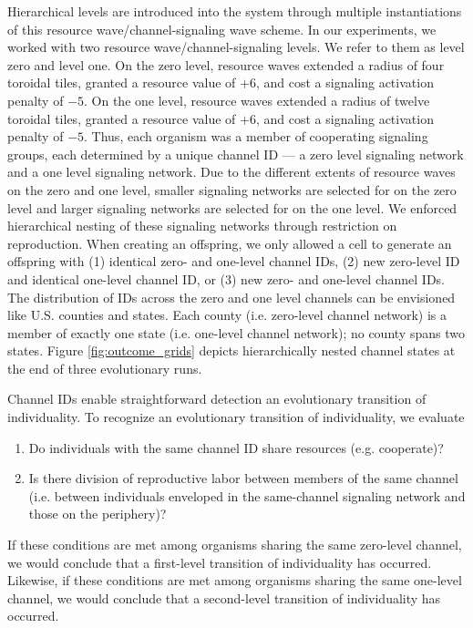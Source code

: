 Hierarchical levels are introduced into the system through multiple instantiations of this resource wave/channel-signaling wave scheme.
In our experiments, we worked with two resource wave/channel-signaling levels.
We refer to them as level zero and level one.
On the zero level, resource waves extended a radius of four toroidal tiles, granted a resource value of $+6$, and cost a signaling activation penalty of $-5$.
On the one level, resource waves extended a radius of twelve toroidal tiles, granted a resource value of $+6$, and cost a signaling activation penalty of $-5$.
Thus, each organism was a member of cooperating signaling groups, each determined by a unique channel ID --- a zero level signaling network and a one level signaling network.
Due to the different extents of resource waves on the zero and one level, smaller signaling networks are selected for on the zero level and larger signaling networks are selected for on the one level.
We enforced hierarchical nesting of these signaling networks through restriction on reproduction.
When creating an offspring, we only allowed a cell to generate an offspring with (1) identical zero- and one-level channel IDs, (2) new zero-level ID and identical one-level channel ID, or (3) new zero- and one-level channel IDs.
The distribution of IDs across the zero and one level channels can be envisioned like U.S. counties and states.
Each county (i.e. zero-level channel network) is a member of exactly one state (i.e. one-level channel network);
no county spans two states.
Figure \ref{fig:outcome_grids} depicts hierarchically nested channel states at the end of three evolutionary runs.

Channel IDs enable straightforward detection an evolutionary transition of individuality.
To recognize an evolutionary transition of individuality, we evaluate
\begin{enumerate}
\item Do individuals with the same channel ID share resources (e.g. cooperate)?
\item Is there division of reproductive labor between members of the same channel (i.e. between individuals enveloped in the same-channel signaling network and those on the periphery)?
\end{enumerate}

If these conditions are met among organisms sharing the same zero-level channel, we would conclude that a first-level transition of individuality has occurred.
Likewise, if these conditions are met among organisms sharing the same one-level channel, we would conclude that a second-level transition of individuality has occurred.

